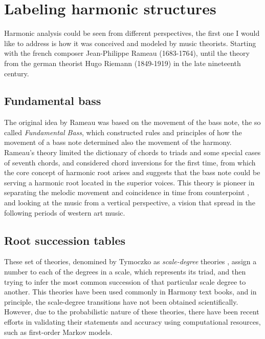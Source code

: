   \section{Labeling harmonic structures}
  Harmonic analysis could be seen from different perspectives, the first one I would like to address is how it was conceived and modeled by music theorists. Starting with the french composer Jean-Philippe Rameau (1683-1764), until the theory from the german theorist Hugo Riemann (1849-1919) in the late nineteenth century.
    \subsection{Fundamental bass}
    The original idea by Rameau was based on the movement of the bass note, the so called \emph{Fundamental Bass}, which constructed rules and principles of how the movement of a bass note determined also the movement of the harmony. Rameau's theory limited the dictionary of chords to triads and some special cases of seventh chords, and considered chord inversions for the first time, from which the core concept of harmonic root arises and suggests that the bass note could be serving a harmonic root located in the superior voices. This theory is pioneer in separating the melodic movement and coincidence in time from counterpoint \cite{beach1974origins}, and looking at the music from a vertical perspective, a vision that spread in the following periods of western art music.
    \subsection{Root succession tables}
    These set of theories, denomined by Tymoczko as \emph{scale-degree} theories \cite{tymoczko2001root}, assign a number to each of the degrees in a scale, which represents its triad, and then trying to infer the most common succession of that particular scale degree to another. This theories have been used commonly in Harmony text books, and in principle, the scale-degree transitions have not been obtained scientifically. However, due to the probabilistic nature of these theories, there have been recent efforts in validating their statements and accuracy using computational resources, such as first-order Markov models.
